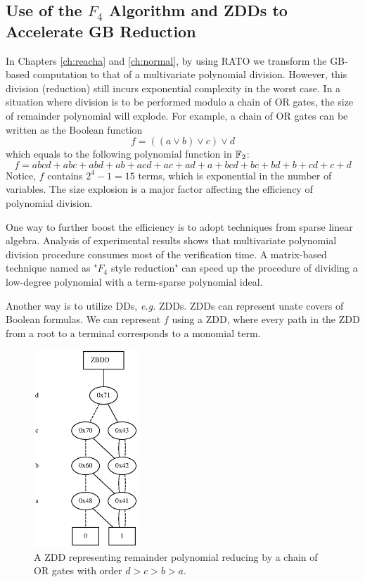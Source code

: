 \subsection{Use of the $F_4$ Algorithm and ZDDs to Accelerate GB Reduction}
In Chapters \ref{ch:reacha} and \ref{ch:normal}, by using RATO we transform the GB-based
computation to that of a multivariate polynomial division. However, this division (reduction)
still incurs exponential complexity in the worst case. In a situation where division is to be performed modulo
a chain of OR gates, the size of remainder polynomial will explode. For example, a chain of OR gates 
can be written as the Boolean function 
\begin{equation}
\label{eqn:chainOR}
f = ((a\lor b) \lor c) \lor d
\end{equation}
which equals to the following polynomial function in ${\mathbb{F}}_2$:
$$f = abcd+abc+abd+ab+acd+ac+ad+a+bcd+bc+bd+b+cd+c+d$$
Notice, $f$ contains $2^4-1 = 15$ terms, which is exponential in the number of variables.
The size explosion is a major factor affecting the efficiency of polynomial division.

One way to further boost the efficiency is to adopt techniques from sparse linear algebra.
Analysis of experimental results shows that multivariate polynomial division procedure
consumes most of the verification time.
A matrix-based technique named as "$F_4$ style reduction" \cite{f4} can speed up the procedure of
dividing a low-degree polynomial with a term-sparse polynomial ideal. 

Another way is to utilize DDs, {\it e.g.} ZDDs. ZDDs can represent unate covers of Boolean formulas.
We can represent $f$ using a ZDD, where every path in the ZDD from a root to a terminal corresponds
to a monomial term.

\begin{figure}[h]
\centerline{
\includegraphics[width=0.35\textwidth]{newfig/ZDD.eps}
}
\caption{A ZDD representing remainder polynomial reducing by a chain of OR gates with order $d>c>b>a$.}
\label{fig:ZDD}
\end{figure}

